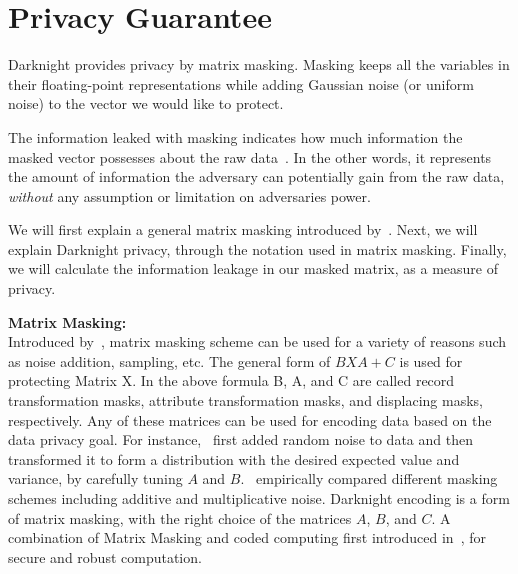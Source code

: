 \section{Privacy Guarantee}
\label{ap:pri}
Darknight provides privacy by matrix masking. Masking keeps all the variables in their floating-point representations while adding Gaussian noise (or uniform noise) to the vector we would like to protect. 

The information leaked with masking indicates how much information the masked vector possesses about the raw data~\citep{guo2020secure, matthews2011data}. In the other words, it represents the amount of information the adversary can potentially gain from the raw data, \textit{without} any assumption or limitation on adversaries power.

We will first explain a general matrix masking introduced by~\citep{cox1980suppression, cox1994matrix}. Next, we will explain Darknight privacy, through the notation used in matrix masking. Finally, we will calculate the information leakage in our masked matrix, as a measure of privacy.

\textbf{Matrix Masking:}\\ 
Introduced by~\citep{cox1980suppression, cox1994matrix}, matrix masking scheme can be used for a variety of reasons such as noise addition, sampling, etc.
The general form of $BXA + C$ is used for protecting Matrix X. In the above formula B, A, and C are called record transformation masks, attribute transformation masks, and displacing masks, respectively. Any of these matrices can be used for encoding data based on the data privacy goal. For instance,~\citep{kim1986method} first added random noise to data and then transformed it to form a distribution with the desired expected value and variance, by carefully tuning $A$ and $B$.~\citep{spruill1983confidentiality} empirically compared different masking schemes including additive and multiplicative noise. Darknight encoding is a form of matrix masking, with the right choice of the matrices $A$, $B$, and $C$. A combination of Matrix Masking and coded computing first introduced in~\cite{yu2019lagrange}, for secure and robust computation.

